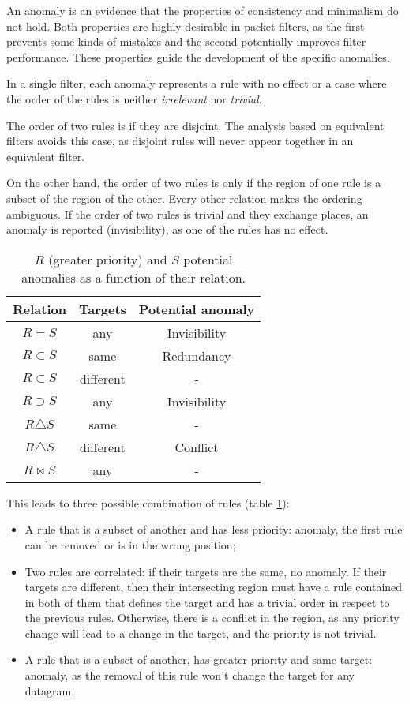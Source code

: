 An anomaly is an evidence that the properties of consistency and minimalism do
not hold. Both properties are highly desirable in packet filters, as the first
prevents some kinds of mistakes and the second potentially improves filter
performance. These properties guide the development of the specific anomalies.

In a single filter, each anomaly represents a rule with no effect or a case where the order of the rules
is neither \emph{irrelevant} nor \emph{trivial}.

The order of two rules is  if
they are disjoint. The analysis based on equivalent filters avoids this case, as
disjoint rules will never appear together in an equivalent filter.

On the other hand, the order of two rules is only
 if the region of one rule is a subset of
the region of the other. Every other relation makes the ordering ambiguous. If the
order of two rules is trivial and they exchange places, an anomaly is reported
(invisibility),
as one of the rules has no effect.

\begin{table}
	\centering
	\caption{\label{tab:anomaliaPotencial} $R$ (greater priority) and $S$
	potential anomalies as a function of their relation.}
	\begin{tabular}{ccc}
		Relation        & Targets    & Potential anomaly \\
		\hline
		$R = S$         & any        & Invisibility \\
		$R \subset S$   & same       & Redundancy \\
		$R \subset S$   & different  & - \\
		$R \supset S$   & any        & Invisibility \\
		$R \triangle S$ & same       & - \\
		$R \triangle S$ & different  & Conflict \\
		$R \bowtie S$   & any        & - \\
	\end{tabular}
\end{table}

This leads to three possible combination of rules (table
\ref{tab:anomaliaPotencial}):
\begin{itemize}
	\item A rule that is a subset of another and has less priority: anomaly, the
		first rule can be removed or is in the wrong position;
	\item Two rules are correlated: if their targets are the same, no anomaly.
		If their targets are different, then their intersecting region must have a rule contained in both of
		them that defines the target and has a trivial order in respect to
		the previous rules. Otherwise, there is a conflict in the
		region, as any priority change will lead to a change in the target, and the
		priority is not trivial.
	\item A rule that is a subset of another, has greater priority and same
		target: anomaly, as the removal of this rule won't change the target for
		any datagram.
\end{itemize}


